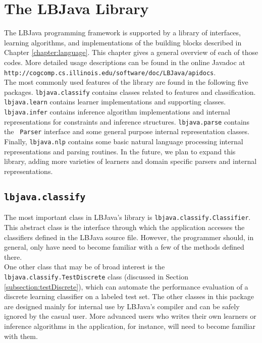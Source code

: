 
\chapter{The LBJava Library}

The LBJava programming framework is supported by a library of interfaces,
learning algorithms, and implementations of the building blocks described in
Chapter \ref{chapter:language}.  This chapter gives a general overview of each
of those codes.  More detailed usage descriptions can be found in the online
Javadoc at {\tt http://cogcomp.cs.illinois.edu/software/doc/LBJava/apidocs}. \\

The most commonly used features of the library are found in the following five packages.  {\tt lbjava.classify}
contains classes related to features and classification.  {\tt lbjava.learn}
contains learner implementations and supporting classes.  {\tt lbjava.infer}
contains inference algorithm implementations and internal representations for
constraints and inference structures.  {\tt lbjava.parse} contains the {\tt
Parser} interface and some general purpose internal representation classes.
Finally, {\tt lbjava.nlp} contains some basic natural language processing
internal representations and parsing routines.  In the future, we plan to
expand this library, adding more varieties of learners and domain specific
parsers and internal representations.

\section{{\tt lbjava.classify}}

The most important class in LBJava's library is {\tt lbjava.classify.Classifier}.
This abstract class is the interface through which the application accesses
the classifiers defined in the LBJava source file.  However, the programmer
should, in general, only have need to become familiar with a few of the
methods defined there. \\

One other class that may be of broad interest is the {\tt
lbjava.classify.TestDiscrete} class (discussed in Section
\ref{subsection:testDiscrete}), which can automate the performance evaluation
of a discrete learning classifier on a labeled test set.  The other classes in
this package are designed mainly for internal use by LBJava's compiler and can be
safely ignored by the casual user.  More advanced users who writes their own
learners or inference algorithms in the application, for instance, will need
to become familiar with them.

